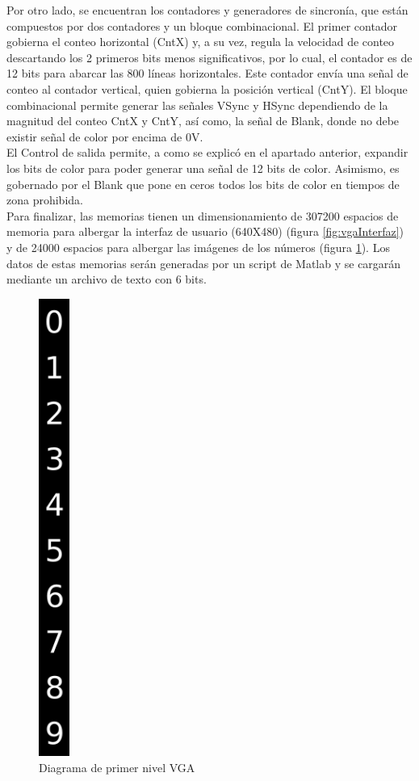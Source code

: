 \documentclass[12pt,a4paper]{article}
\begin{document}
		Por otro lado, se encuentran los contadores y generadores de sincronía, que están compuestos por dos contadores y un bloque combinacional. El primer contador gobierna el conteo horizontal (CntX) y, a su vez, regula la velocidad de conteo descartando los 2 primeros bits menos significativos, por lo cual, el contador es de 12 bits para abarcar las 800 líneas horizontales. Este contador envía una señal de conteo al contador vertical, quien gobierna la posición vertical (CntY). El bloque combinacional permite generar las señales VSync y HSync dependiendo de la magnitud del conteo CntX y CntY, así como, la señal de Blank, donde no debe existir señal de color por encima de 0V.\\[2ex]
		El Control de salida permite, a como se explicó en el apartado anterior, expandir los bits de color para poder generar una señal de 12 bits de color. Asimismo, es gobernado por el Blank que pone en ceros todos los bits de color en tiempos de zona prohibida. \\[2ex]
		Para finalizar, las memorias tienen un dimensionamiento de 307200 espacios de memoria para albergar la interfaz de usuario (640X480) (figura \ref{fig:vgaInterfaz}) y de 24000 espacios para albergar las imágenes de los números (figura \ref{fig:vgaNumeros}). Los datos de estas memorias serán generadas por un script de Matlab y se cargarán mediante un archivo de texto con 6 bits. \\[2ex]
		
		
		\begin{figure}[hbtp]
			\centering
			\includegraphics[width=1cm]{img/VGANumeros.png}
			\caption{Diagrama de primer nivel VGA}
			\label{fig:vgaNumeros}
		\end{figure}
		
\end{document}
